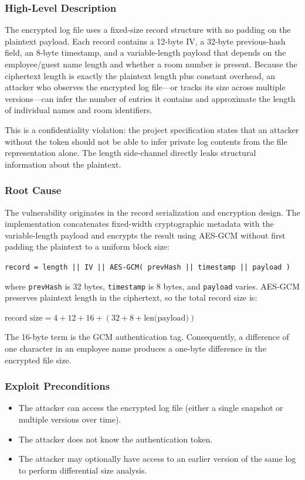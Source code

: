 \documentclass[a4paper, 12pt]{article}
\begin{document}
    \subsubsection{High-Level Description}
    The encrypted log file uses a fixed-size record structure with no padding on the plaintext payload. Each record contains a 12-byte IV, a 32-byte previous-hash field, an 8-byte timestamp, and a variable-length payload that depends on the employee/guest name length and whether a room number is present. Because the ciphertext length is exactly the plaintext length plus constant overhead, an attacker who observes the encrypted log file---or tracks its size across multiple versions---can infer the number of entries it contains and approximate the length of individual names and room identifiers.

    This is a confidentiality violation: the project specification states that an attacker without the token should not be able to infer private log contents from the file representation alone. The length side-channel directly leaks structural information about the plaintext.

    \subsubsection{Root Cause}
    The vulnerability originates in the record serialization and encryption design. The implementation concatenates fixed-width cryptographic metadata with the variable-length payload and encrypts the result using AES-GCM without first padding the plaintext to a uniform block size:
    \begin{center}
        \texttt{record = length || IV || AES-GCM( prevHash || timestamp || payload )}
    \end{center}
    where \texttt{prevHash} is 32 bytes, \texttt{timestamp} is 8 bytes, and \texttt{payload} varies. AES-GCM preserves plaintext length in the ciphertext, so the total record size is:
    \begin{center}
        $\text{record size} = 4 + 12 + 16 + (32 + 8 + \text{len(payload)})$
    \end{center}
    The 16-byte term is the GCM authentication tag. Consequently, a difference of one character in an employee name produces a one-byte difference in the encrypted file size.

    \subsubsection{Exploit Preconditions}
    \begin{itemize}
        \item The attacker can access the encrypted log file (either a single snapshot or multiple versions over time).
        \item The attacker does not know the authentication token.
        \item The attacker may optionally have access to an earlier version of the same log to perform differential size analysis.
    \end{itemize}
\end{document}
